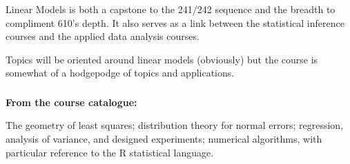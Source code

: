 




\begin{frame}[fragile] \frametitle{}

Linear Models is both a capstone to the 241/242 sequence
and the breadth to compliment 610's depth. It also
serves as a link between the statistical inference courses
and the applied data analysis courses.\pause

Topics will be oriented around linear models (obviously) but
the course is somewhat of a hodgepodge of topics and applications.

\end{frame}


\begin{frame}[fragile] \frametitle{}

{\bf From the course catalogue:}

The geometry of least squares; distribution theory for normal errors; regression, analysis of variance, and designed experiments; numerical algorithms, with particular reference to the R statistical language.

\end{frame}

